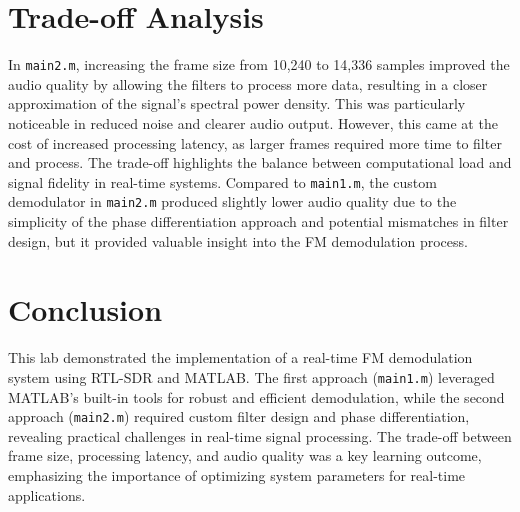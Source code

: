 \documentclass{article}
\begin{document}
\section*{Trade-off Analysis}
In \texttt{main2.m}, increasing the frame size from 10,240 to 14,336 samples improved the audio quality by allowing the filters to process more data, resulting in a closer approximation of the signal's spectral power density. This was particularly noticeable in reduced noise and clearer audio output. However, this came at the cost of increased processing latency, as larger frames required more time to filter and process. The trade-off highlights the balance between computational load and signal fidelity in real-time systems. Compared to \texttt{main1.m}, the custom demodulator in \texttt{main2.m} produced slightly lower audio quality due to the simplicity of the phase differentiation approach and potential mismatches in filter design, but it provided valuable insight into the FM demodulation process.

\section*{Conclusion}
This lab demonstrated the implementation of a real-time FM demodulation system using RTL-SDR and MATLAB. The first approach (\texttt{main1.m}) leveraged MATLAB's built-in tools for robust and efficient demodulation, while the second approach (\texttt{main2.m}) required custom filter design and phase differentiation, revealing practical challenges in real-time signal processing. The trade-off between frame size, processing latency, and audio quality was a key learning outcome, emphasizing the importance of optimizing system parameters for real-time applications.
\end{document}
